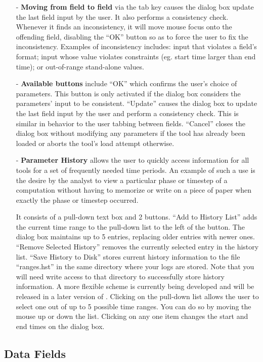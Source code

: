 \documentclass[10pt]{report}
\begin{document}
\begin{itemize}
\item[-] {\bf Moving from field to field} via the tab key causes the
dialog box update the last field input by the user. It also performs a
consistency check. Whenever it finds an inconsistency, it will move
mouse focus onto the offending field, disabling the ``OK'' button so
as to force the user to fix the inconsistency. Examples of
inconsistency includes: input that violates a field's format; input
whose value violates constraints (eg. start time larger than end
time); or out-of-range stand-alone values.
\item[-] {\bf Available buttons} include ``OK'' which confirms the
user's choice of parameters. This button is only activated if the
dialog box considers the parameters' input to be
consistent. ``Update'' causes the dialog box to update the last field
input by the user and perform a consistency check. This is similar in
behavior to the user tabbing between fields. ``Cancel'' closes the
dialog box without modifying any parameters if the tool has already
been loaded or aborts the tool's load attempt otherwise.
\item[-] {\bf Parameter History} allows the user to quickly access
information for all tools for a set of frequently needed time
periods. An example of such a use is the desire by the analyst to view
a particular phase or timestep of a computation without having to
memorize or write on a piece of paper when exactly the phase or
timestep occurred.

It consists of a pull-down text box and 2 buttons. ``Add to History
List'' adds the current time range to the pull-down list to the left
of the button. The dialog box maintains up to 5 entries, replacing
older entries with newer ones. ``Remove Selected History'' removes the
currently selected entry in the history list. ``Save History to Disk''
stores current history information to the file ``ranges.hst'' in the
same directory where your logs are stored. Note that you will need
write access to that directory to successfully store history
information. A more flexible scheme is currently being developed and
will be released in a later version of \projections{}. Clicking on the
pull-down list allows the user to select one out of up to 5 possible
time ranges. You can do so by moving the mouse up or down the
list. Clicking on any one item changes the start and end times on the
dialog box.
\end{itemize}

\subsection{Data Fields}
\end{document}

